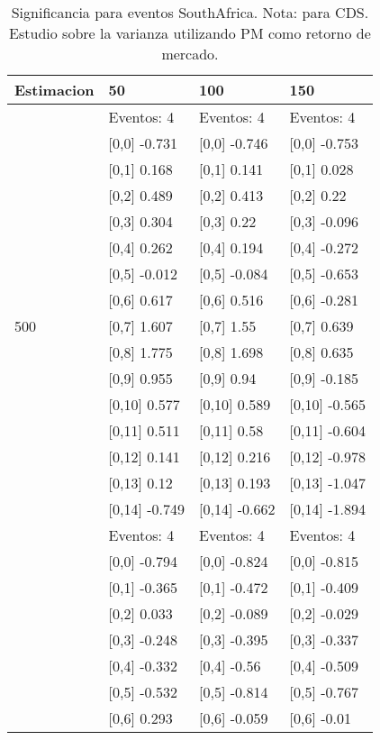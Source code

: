 \begin{table}

\caption{Significancia para eventos SouthAfrica. Nota: para CDS. Estudio sobre la varianza utilizando PM como retorno de mercado.}
\centering
\begin{tabular}[t]{llll}
\toprule
Estimacion & 50 & 100 & 150\\
\midrule
 & Eventos:  4 & Eventos:  4 & Eventos:  4\\
 & {}[0,0] -0.731 & {}[0,0] -0.746 & {}[0,0] -0.753\\
 & {}[0,1] 0.168 & {}[0,1] 0.141 & {}[0,1] 0.028\\
 & {}[0,2] 0.489 & {}[0,2] 0.413 & {}[0,2] 0.22\\
 & {}[0,3] 0.304 & {}[0,3] 0.22 & {}[0,3] -0.096\\
\addlinespace
 & {}[0,4] 0.262 & {}[0,4] 0.194 & {}[0,4] -0.272\\
 & {}[0,5] -0.012 & {}[0,5] -0.084 & {}[0,5] -0.653\\
 & {}[0,6] 0.617 & {}[0,6] 0.516 & {}[0,6] -0.281\\
500 & {}[0,7] 1.607 & {}[0,7] 1.55 & {}[0,7] 0.639\\
 & {}[0,8] 1.775 & {}[0,8] 1.698 & {}[0,8] 0.635\\
\addlinespace
 & {}[0,9] 0.955 & {}[0,9] 0.94 & {}[0,9] -0.185\\
 & {}[0,10] 0.577 & {}[0,10] 0.589 & {}[0,10] -0.565\\
 & {}[0,11] 0.511 & {}[0,11] 0.58 & {}[0,11] -0.604\\
 & {}[0,12] 0.141 & {}[0,12] 0.216 & {}[0,12] -0.978\\
 & {}[0,13] 0.12 & {}[0,13] 0.193 & {}[0,13] -1.047\\
\addlinespace
 & {}[0,14] -0.749 & {}[0,14] -0.662 & {}[0,14] -1.894\\
 & Eventos:  4 & Eventos:  4 & Eventos:  4\\
 & {}[0,0] -0.794 & {}[0,0] -0.824 & {}[0,0] -0.815\\
 & {}[0,1] -0.365 & {}[0,1] -0.472 & {}[0,1] -0.409\\
 & {}[0,2] 0.033 & {}[0,2] -0.089 & {}[0,2] -0.029\\
\addlinespace
 & {}[0,3] -0.248 & {}[0,3] -0.395 & {}[0,3] -0.337\\
 & {}[0,4] -0.332 & {}[0,4] -0.56 & {}[0,4] -0.509\\
 & {}[0,5] -0.532 & {}[0,5] -0.814 & {}[0,5] -0.767\\
 & {}[0,6] 0.293 & {}[0,6] -0.059 & {}[0,6] -0.01\\

\end{tabular}
\end{table}
